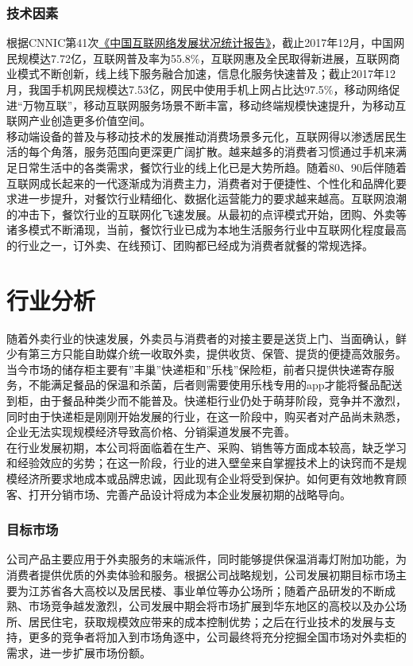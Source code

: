 \documentclass[violet]{main}
\begin{document}
			\subsubsection{技术因素}
				根据CNNIC第41次\href{http://www.cac.gov.cn/2018-01/31/c\_1122347026.htm}{《中国互联网络发展状况统计报告》}，截止2017年12月，中国网民规模达7.72亿，互联网普及率为55.8\%，互联网惠及全民取得新进展，互联网商业模式不断创新，线上线下服务融合加速，信息化服务快速普及；截止2017年12月，我国手机网民规模达7.53亿，网民中使用手机上网占比达97.5\%，移动网络促进“万物互联”，移动互联网服务场景不断丰富，移动终端规模快速提升，为移动互联网产业创造更多价值空间。
				\\\indent 移动端设备的普及与移动技术的发展推动消费场景多元化，互联网得以渗透居民生活的每个角落，服务范围向更深更广阔扩散。越来越多的消费者习惯通过手机来满足日常生活中的各类需求，餐饮行业的线上化已是大势所趋。随着80、90后伴随着互联网成长起来的一代逐渐成为消费主力，消费者对于便捷性、个性化和品牌化要求进一步提升，对餐饮行业精细化、数据化运营能力的要求越来越高。互联网浪潮的冲击下，餐饮行业的互联网化飞速发展。从最初的点评模式开始，团购、外卖等诸多模式不断涌现，当前，餐饮行业已成为本地生活服务行业中互联网化程度最高的行业之一，订外卖、在线预订、团购都已经成为消费者就餐的常规选择。
		\section{行业分析}
			随着外卖行业的快速发展，外卖员与消费者的对接主要是送货上门、当面确认，鲜少有第三方只能自助媒介统一收取外卖，提供收货、保管、提货的便捷高效服务。当今市场的储存柜主要有”丰巢”快递柜和”乐栈”保险柜，前者只提供快递寄存服务，不能满足餐品的保温和杀菌，后者则需要使用乐栈专用的app才能将餐品配送到柜，由于餐品种类少而不能普及。快递柜行业仍处于萌芽阶段，竞争并不激烈，同时由于快递柜是刚刚开始发展的行业，在这一阶段中，购买者对产品尚未熟悉，企业无法实现规模经济导致高价格、分销渠道发展不完善。
			\\\indent 在行业发展初期，本公司将面临着在生产、采购、销售等方面成本较高，缺乏学习和经验效应的劣势；在这一阶段，行业的进入壁垒来自掌握技术上的诀窍而不是规模经济所要求地成本或品牌忠诚，因此现有企业将受到保护。如何更有效地教育顾客、打开分销市场、完善产品设计将成为本企业发展初期的战略导向。
			\subsubsection{目标市场}
				公司产品主要应用于外卖服务的末端派件，同时能够提供保温消毒灯附加功能，为消费者提供优质的外卖体验和服务。根据公司战略规划，公司发展初期目标市场主要为江苏省各大高校以及居民楼、事业单位等办公场所；随着产品研发的不断成熟、市场竞争越发激烈，公司发展中期会将市场扩展到华东地区的高校以及办公场所、居民住宅，获取规模效应带来的成本控制优势；之后在行业技术的发展与支持，更多的竞争者将加入到市场角逐中，公司最终将充分挖掘全国市场对外卖柜的需求，进一步扩展市场份额。
\end{document}
